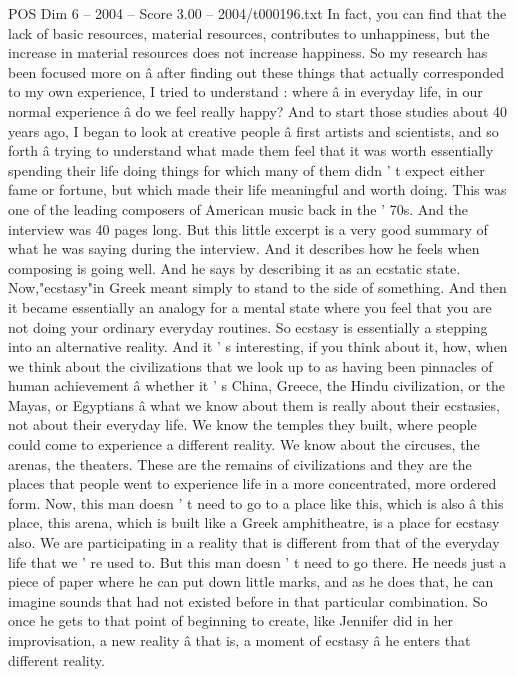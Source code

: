 \begin{textsample}{POS Dim 6 – 2004 – Score 3.00 – 2004/t000196.txt}
In fact, you can find that the lack of basic resources, material resources, contributes to unhappiness, but the increase in material resources does not increase happiness.
So my research has been focused more on â after finding out these things that actually corresponded to my own experience, I tried to understand : where â in everyday life, in our normal experience â do we feel really happy?
And to start those studies about 40 years ago, I began to look at creative people â first artists and scientists, and so forth â trying to understand what made them feel that it was worth essentially spending their life doing things for which many of them didn ' t expect either fame or fortune, but which made their life meaningful and worth doing.
This was one of the leading composers of American music back in the ' 70s.
And the interview was 40 pages long.
But this little excerpt is a very good summary of what he was saying during the interview.
And it describes how he feels when composing is going well.
And he says by describing it as an ecstatic state.
Now,"ecstasy"in Greek meant simply to stand to the side of something.
And then it became essentially an analogy for a mental state where you feel that you are not doing your ordinary everyday routines.
So ecstasy is essentially a stepping into an alternative reality.
And it ' s interesting, if you think about it, how, when we think about the civilizations that we look up to as having been pinnacles of human achievement â whether it ' s China, Greece, the Hindu civilization, or the Mayas, or Egyptians â what we know about them is really about their ecstasies, not about their everyday life.
We know the temples they built, where people could come to experience a different reality.
We know about the circuses, the arenas, the theaters.
These are the remains of civilizations and they are the places that people went to experience life in a more concentrated, more ordered form.
Now, this man doesn ' t need to go to a place like this, which is also â this place, this arena, which is built like a Greek amphitheatre, is a place for ecstasy also.
We are participating in a reality that is different from that of the everyday life that we ' re used to.
But this man doesn ' t need to go there.
He needs just a piece of paper where he can put down little marks, and as he does that, he can imagine sounds that had not existed before in that particular combination.
So once he gets to that point of beginning to create, like Jennifer did in her improvisation, a new reality â that is, a moment of ecstasy â he enters that different reality.

\end{textsample}
